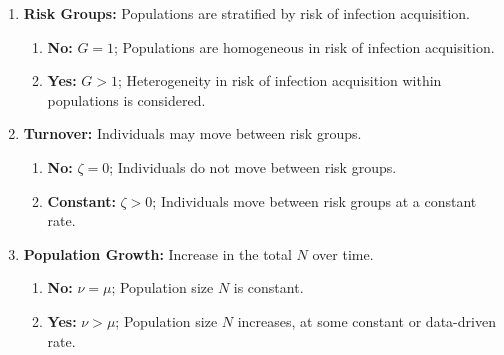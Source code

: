 \begin{fboxed}
  \begin{enumerate}[leftmargin=1em]
    \item\label{ass:risk-groups}\textbf{Risk Groups:}
    Populations are stratified by risk of infection acquisition.
    \begin{enumerate}
      \item\label{ass:risk-groups-no}\textbf{No:} $G = 1$;
      Populations are homogeneous in risk of infection acquisition.
      \item\label{ass:risk-groups-yes}\textbf{Yes:} $G > 1$;
      Heterogeneity in risk of infection acquisition within populations is considered.
    \end{enumerate}
    \item\label{ass:turnover}\textbf{Turnover:}
    Individuals may move between risk groups.
    \begin{enumerate}
      \item\textbf{No:} $\zeta = 0$;
      Individuals do not move between risk groups.
      \item\textbf{Constant:} $\zeta > 0$;
      Individuals move between risk groups at a constant rate.
    \end{enumerate}
    \item\label{ass:pop-growth}\textbf{Population Growth:}
    Increase in the total $N$ over time.
    \begin{enumerate}
      \item\textbf{No:} $\nu = \mu$;
      Population size $N$ is constant.
      \item\textbf{Yes:} $\nu > \mu$;
      Population size $N$ increases, at some constant or data-driven rate.
    \end{enumerate}
  \end{enumerate}
\end{fboxed}
